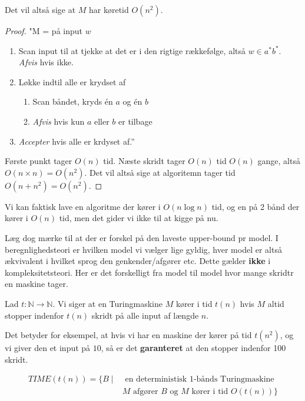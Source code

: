 Det vil altså sige at $M$ har køretid $O(n^{2})$.

\begin{proof}
  "M = på input $w$
  \begin{enumerate}
    \item Scan input til at tjekke at det er i den rigtige rækkefølge, altså $w \in a^{*}b^{*}$. \textit{Afvis} hvis ikke.

    \item Løkke indtil alle er krydset af
          \begin{enumerate}
            \item Scan båndet, kryds én $a$ og én $b$
            \item \textit{Afvis} hvis kun $a$ eller $b$ er tilbage
          \end{enumerate}
    \item \textit{Accepter} hvis alle er krdyset af.''
  \end{enumerate}

  Første punkt tager $O(n)$ tid.
  Næste skridt tager $O(n)$ tid $O(n)$ gange, altså $O(n \times n) = O(n^{2})$. Det vil altså sige at algoritemn tager tid $O(n + n^{2}) = O(n^{2})$.
\end{proof}

Vi kan faktisk lave en algoritme der kører i $O(n \log n)$ tid, og en på 2 bånd der kører i $O(n)$ tid, men det gider vi ikke til at kigge på nu.

Læg dog mærke til at der er forskel på den laveste upper-bound pr model. I beregnlighedsteori er hvilken model vi vælger lige gyldig, hver model er altså ækvivalent i hvilket sprog den genkender/afgører etc. Dette gælder \textbf{ikke} i kompleksitetsteori. Her er det forskelligt fra model til model hvor mange skridtr en maskine tager.

\begin{definition}
Lad $t: \mathbb{N} \longrightarrow \mathbb{N}$. Vi siger at en Turingmaskine $M$ kører i tid $t(n)$ hvis $M$ altid stopper indenfor $t(n)$ skridt på alle input af længde $n$.
\end{definition}

Det betyder for eksempel, at hvis vi har en maskine der kører på tid $t(n^{2})$, og vi giver den et input på $10$, så er det \textbf{garanteret} at den stopper indenfor 100 skridt.

\begin{definition}
  \begin{align*}
    TIME(t(n)) = \{B \mid &\text{ en deterministisk 1-bånds Turingmaskine }\\
    &M \text{ afgører } B \text{ og } M \text{ kører i tid } O(t(n))\}
  \end{align*}
\end{definition}

